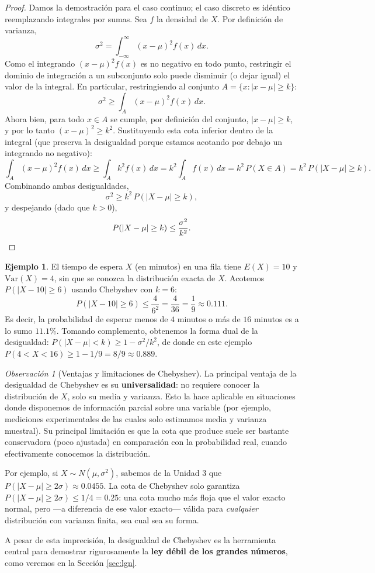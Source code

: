 \documentclass[11pt,a4paper]{article}
\theoremstyle{plain}
\theoremstyle{definition}
\newtheorem{ejemplo}[teorema]{Ejemplo}
\theoremstyle{remark}
\newtheorem{observacion}[teorema]{Observación}
\begin{document}
\begin{proof}
Damos la demostración para el caso continuo; el caso discreto es idéntico reemplazando integrales por sumas. Sea $f$ la densidad de $X$. Por definición de varianza,
\[
\sigma^2 = \int_{-\infty}^{\infty} (x-\mu)^2 f(x)\,dx.
\]
Como el integrando $(x-\mu)^2 f(x)$ es no negativo en todo punto, restringir el dominio de integración a un subconjunto solo puede disminuir (o dejar igual) el valor de la integral. En particular, restringiendo al conjunto $A=\{x : |x-\mu|\geq k\}$:
\[
\sigma^2 \geq \int_{A} (x-\mu)^2 f(x)\,dx.
\]
Ahora bien, para todo $x\in A$ se cumple, por definición del conjunto, $|x-\mu|\geq k$, y por lo tanto $(x-\mu)^2\geq k^2$. Sustituyendo esta cota inferior dentro de la integral (que preserva la desigualdad porque estamos acotando por debajo un integrando no negativo):
\[
\int_A (x-\mu)^2 f(x)\,dx \geq \int_A k^2 f(x)\,dx = k^2 \int_A f(x)\,dx = k^2\, P(X\in A) = k^2\, P(|X-\mu|\geq k).
\]
Combinando ambas desigualdades,
\[
\sigma^2 \geq k^2\, P(|X-\mu|\geq k),
\]
y despejando (dado que $k>0$),
\[
P(|X-\mu|\geq k) \leq \frac{\sigma^2}{k^2}. \qedhere
\]
\end{proof}

\begin{ejemplo}
El tiempo de espera $X$ (en minutos) en una fila tiene $E(X)=10$ y $\text{Var}(X)=4$, sin que se conozca la distribución exacta de $X$. Acotemos $P(|X-10|\geq 6)$ usando Chebyshev con $k=6$:
\[
P(|X-10|\geq 6) \leq \frac{4}{6^2} = \frac{4}{36} = \frac19 \approx 0.111.
\]
Es decir, la probabilidad de esperar menos de $4$ minutos o más de $16$ minutos es a lo sumo $11.1\%$. Tomando complemento, obtenemos la forma dual de la desigualdad: $P(|X-\mu|<k)\geq 1-\sigma^2/k^2$, de donde en este ejemplo $P(4<X<16)\geq 1-1/9 = 8/9\approx 0.889$.
\end{ejemplo}

\begin{observacion}[Ventajas y limitaciones de Chebyshev]
La principal ventaja de la desigualdad de Chebyshev es su \textbf{universalidad}: no requiere conocer la distribución de $X$, solo su media y varianza. Esto la hace aplicable en situaciones donde disponemos de información parcial sobre una variable (por ejemplo, mediciones experimentales de las cuales solo estimamos media y varianza muestral). Su principal limitación es que la cota que produce suele ser bastante conservadora (poco ajustada) en comparación con la probabilidad real, cuando efectivamente conocemos la distribución.

Por ejemplo, si $X\sim N(\mu,\sigma^2)$, sabemos de la Unidad 3 que $P(|X-\mu|\geq 2\sigma)\approx 0.0455$. La cota de Chebyshev solo garantiza $P(|X-\mu|\geq 2\sigma)\leq 1/4=0.25$: una cota mucho más floja que el valor exacto normal, pero —a diferencia de ese valor exacto— válida para \emph{cualquier} distribución con varianza finita, sea cual sea su forma.

A pesar de esta imprecisión, la desigualdad de Chebyshev es la herramienta central para demostrar rigurosamente la \textbf{ley débil de los grandes números}, como veremos en la Sección \ref{sec:lgn}.
\end{observacion}
\end{document}
